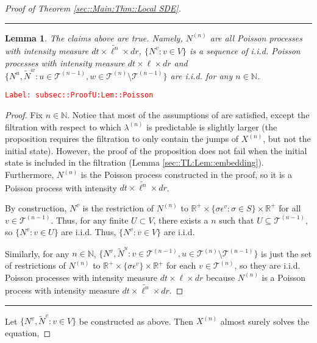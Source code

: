 \documentclass[12pt]{article}
\newcommand{\mb}{\mathbb}
\newcommand{\mc}{\mathcal}
\newcommand{\ep}{\epsilon}
\newcommand{\tr}{\textcolor{red}}
\newcommand{\labe}[1]{\tr{\texttt{Label: #1}}}
\newcommand{\ind}{\hspace{24pt}}
\newcommand{\lin}{\rule{\linewidth}{0.4 pt}}
\renewcommand{\v}{v}							%
\newcommand{\vv}{u}								%
\newcommand{\vvv}{w}							%
\renewcommand{\U}{U}							%
\renewcommand{\S}{S}							%
\newcommand{\s}{\sigma}							%
\newcommand{\ev}{\ep}							%
\renewcommand{\t}{t}							%
\newcommand{\X}{X}								%
\newcommand{\vind}[1]{^{#1}}					%
\newcommand{\tree}{\mc{T}}						%
\newcommand{\sln}[1]{^{(#1)}}					%
\newcommand{\poiss}{N}							%
\newcommand{\Sm}{\ell}							%
\newcommand{\rate}{\lambda}						%
\renewcommand{\r}{r}							%
\newcommand{\alt}[1]{\widetilde{#1}}			%
\newtheorem{lem}[thms]{Lemma}
\begin{document}
\begin{proof}[Proof of Theorem \ref{sec::Main:Thm::Local SDE}]
\lin

\begin{lem}
The claims above are true. Namely, \(\poiss\sln{n}\) are all Poisson processes with intensity measure \(d\t\times\alt{\Sm^{n}}\times d\r\), \(\{\poiss\vind{\v}:\v\in V\}\) is a sequence of i.i.d. Poisson processes with intensity measure \(d\t\times\Sm\times d\r\) and \(\{\poiss\vind{\vv},\alt{\poiss}\vind{\vvv}:\vv\in \tree\sln{n-1},\vvv\in\tree\sln{n}\setminus\tree\sln{n-1}\}\) are i.i.d. for any \(n \in \mb{N}\).

\label{subsec::ProofU:Lem::Poisson}
\end{lem}
\labe{subsec::ProofU:Lem::Poisson}
\begin{proof}

Fix \(n \in \mb{N}\). Notice that most of the assumptions of \cite[Proposition 14.7.I(b)]{DalVer08} are satisfied, except the filtration with respect to which \(\rate\sln{n}\) is predictable is slightly larger (the proposition requires the filtration to only contain the jumps of \(\X\sln{n}\), but not the initial state). However, the proof of the proposition does not fail when the initial state is included in the filtration (Lemma \ref{sec::TL:Lem::embedding}). Furthermore, \(\poiss\sln{n}\) is the Poisson process constructed in the proof, so it is a Poisson process with intensity \(d\t\times \alt{\Sm^n}\times d\r\).

\ind By construction, \(\poiss\vind{\v}\) is the restriction of \(\poiss\sln{n}\) to \(\mb{R}^+ \times \{\s\ev\vind{\v}: \s\in \S\}\times \mb{R}^+\) for all \(\v\in \tree\sln{n-1}\). Thus, for any finite \(\U \subset V\), there exists a \(n\) such that \(\U \subseteq \tree\sln{n-1}\), so \(\{\poiss\vind{\v}: \v\in \U\}\) are i.i.d. Thus, \(\{\poiss\vind{\v}: \v\in V\}\) are i.i.d.

\ind Similarly, for any \(n \in \mb{N}\), \(\{\poiss\vind{\v},\alt{\poiss}\vind{\vv}: \v \in \tree\sln{n-1},\vv\in\tree\sln{n}\setminus\tree\sln{n-1}\}\) is just the set of restrictions of \(\poiss\sln{n}\) to \(\mb{R}^+\times\{\s\ev\vind{\v}\}\times\mb{R}^+\) for each \(\v\in \tree\sln{n}\), so they are i.i.d. Poisson processes with intensity measure \(d\t\times \Sm\times d\r\) because \(\poiss\sln{n}\) is a Poisson process with intensity measure \(d\t\times\alt{\Sm^n}\times d\r\).
\end{proof}

\lin

Let \(\{\poiss\vind{\v},\alt{\poiss}\vind{\v}:\v\in V\}\) be constructed as above. Then \(\X\sln{n}\) almost surely solves the equation,


\end{proof}
\end{document}
